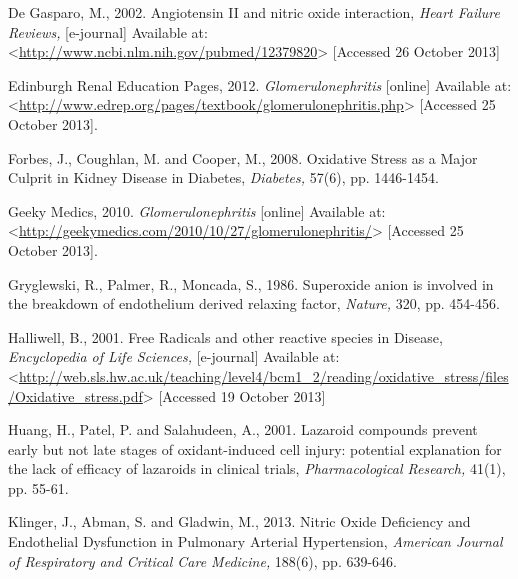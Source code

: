\documentclass[12pt]{report}
\begin{document}
De Gasparo, M., 2002. Angiotensin II and nitric oxide interaction, \textit{Heart Failure Reviews,} [e-journal] Available at:<\url{http://www.ncbi.nlm.nih.gov/pubmed/12379820}> [Accessed 26 October 2013]
\newline
\newline

Edinburgh Renal Education Pages, 2012. \textit{Glomerulonephritis} [online] Available at: <\url{http://www.edrep.org/pages/textbook/glomerulonephritis.php}> [Accessed 25 October 2013].
\newline
\newline

Forbes, J., Coughlan, M. and Cooper, M., 2008. Oxidative Stress as a Major Culprit in Kidney Disease in Diabetes, \textit{Diabetes,} 57(6), pp. 1446-1454.
\newline
\newline

Geeky Medics, 2010. \textit{Glomerulonephritis} [online] Available at: <\url{http://geekymedics.com/2010/10/27/glomerulonephritis/}> [Accessed 25 October 2013].
\newline
\newline

Gryglewski, R., Palmer, R., Moncada, S., 1986. Superoxide anion is involved in the break­down of endothelium derived relaxing factor, \textit{Nature,} 320, pp. 454-456.
\newline
\newline

Halliwell, B., 2001. Free Radicals and other reactive species in Disease, \textit{Encyclopedia of Life Sciences,} [e-journal] Available at:<\url{http://web.sls.hw.ac.uk/teaching/level4/bcm1_2/reading/oxidative_stress/files/Oxidative_stress.pdf}> [Accessed 19 October 2013]
\newline
\newline

Huang, H., Patel, P. and Salahudeen, A., 2001. Lazaroid compounds prevent early but not late stages of oxidant-induced cell injury: potential explanation for the lack of efficacy of lazaroids in clinical trials, \textit{Pharmacological Research,} 41(1), pp. 55-61.
\newline
\newline

Klinger, J., Abman, S. and Gladwin, M., 2013. Nitric Oxide Deficiency and Endothelial Dysfunction in Pulmonary Arterial Hypertension, \textit{American Journal of Respiratory and Critical Care Medicine,} 188(6), pp. 639-646.
\newline
\newline
\end{document}

